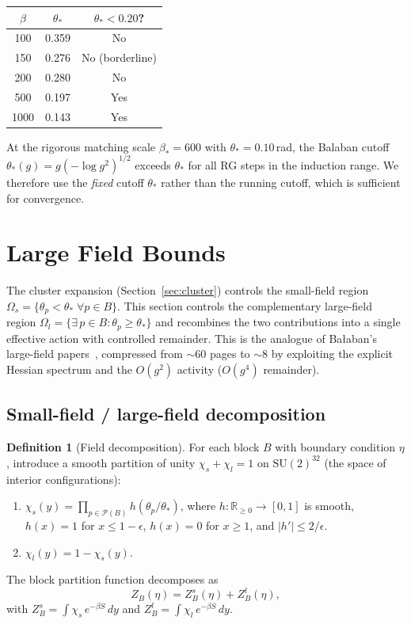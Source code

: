 \documentclass[11pt]{article}
\theoremstyle{definition}
\newtheorem{definition}[theorem]{Definition}
\newcommand{\SU}{\mathrm{SU}}
\newcommand{\R}{\mathbb{R}}
\begin{document}
\begin{center}
\begin{tabular}{ccc}
\toprule
$\beta$ & $\theta_*$ & $\theta_*<0.20$?\\
\midrule
100 & 0.359 & No\\
150 & 0.276 & No (borderline)\\
200 & 0.280 & No\\
500 & 0.197 & Yes\\
1000 & 0.143 & Yes\\
\bottomrule
\end{tabular}
\end{center}
At the rigorous matching scale $\beta_*=600$ with
$\theta_*=0.10$\,rad, the Balaban cutoff
$\theta_*(g)=g(-\log g^2)^{1/2}$ exceeds $\theta_*$ for all
RG steps in the induction range.  We therefore use the
\emph{fixed} cutoff $\theta_*$ rather than the running cutoff,
which is sufficient for convergence.

\section{Large Field Bounds}\label{sec:largefield}

The cluster expansion (Section~\ref{sec:cluster}) controls the small-field
region $\Omega_s=\{\theta_p<\theta_*\;\forall p\in B\}$.  This section
controls the complementary large-field region
$\Omega_l=\{\exists\,p\in B:\theta_p\ge\theta_*\}$ and recombines the
two contributions into a single effective action with controlled remainder.
This is the analogue of Ba\l aban's large-field papers~\cite{BalabanLF1,BalabanLF2},
compressed from ${\sim}60$ pages to ${\sim}8$ by exploiting the explicit
Hessian spectrum and the $O(g^2)$ activity ($O(g^4)$ remainder).

\subsection{Small-field / large-field decomposition}

\begin{definition}[Field decomposition]\label{def:decomp}
For each block $B$ with boundary condition $\eta$, introduce a smooth
partition of unity $\chi_s+\chi_l=1$ on $\SU(2)^{32}$ (the space of
interior configurations):
\begin{enumerate}[nosep,label=(\roman*)]
\item $\chi_s(y)=\prod_{p\in\mathcal{P}(B)}h(\theta_p/\theta_*)$,
where $h:\R_{\ge 0}\to[0,1]$ is smooth, $h(x)=1$ for $x\le 1-\epsilon$,
$h(x)=0$ for $x\ge 1$, and $|h'|\le 2/\epsilon$.
\item $\chi_l(y)=1-\chi_s(y)$.
\end{enumerate}
The block partition function decomposes as
\begin{equation}\label{eq:Z-decomp}
Z_B(\eta)=Z_B^s(\eta)+Z_B^l(\eta),
\end{equation}
with $Z_B^s=\int\chi_s\,e^{-\beta S}\,dy$ and
$Z_B^l=\int\chi_l\,e^{-\beta S}\,dy$.
\end{definition}
\end{document}
